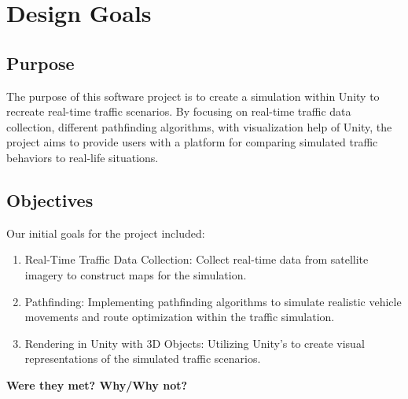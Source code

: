 \section{Design Goals}
\subsection{Purpose}
The purpose of this software project is to create a simulation within Unity to recreate real-time traffic scenarios. By focusing on real-time traffic data collection, different pathfinding algorithms, with visualization help of Unity, the project aims to provide users with a platform for comparing simulated traffic behaviors to real-life situations.
\subsection{Objectives}
Our initial goals for the project included:

\begin{enumerate}
	\item Real-Time Traffic Data Collection:
	Collect real-time data from satellite imagery to construct maps for the simulation.
	\item Pathfinding:
	Implementing pathfinding algorithms to simulate realistic vehicle movements and route optimization within the traffic simulation.
	\item Rendering in Unity with 3D Objects:
	Utilizing Unity's to create visual representations of the simulated traffic scenarios.
\end{enumerate}
\textbf{ Were they met? Why/Why not?}

